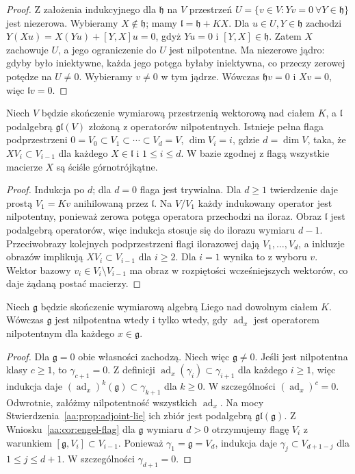 \begin{proof}
Z założenia indukcyjnego dla $\mathfrak h$ na $V$
przestrzeń $U=\{v\in V:Yv=0\ \forall Y\in\mathfrak h\}$
jest niezerowa. Wybieramy $X\notin\mathfrak h$;
mamy $\mathfrak l=\mathfrak h+KX$.
Dla $u\in U,Y\in\mathfrak h$ zachodzi
$Y(Xu)=X(Yu)+[Y,X]u=0$,
gdyż $Yu=0$ i $[Y,X]\in\mathfrak h$.
Zatem $X$ zachowuje $U$, a jego ograniczenie
do $U$ jest nilpotentne. Ma niezerowe jądro:
gdyby było iniektywne, każda jego potęga byłaby
iniektywna, co przeczy zerowej potędze na $U\ne0$.
Wybieramy $v\ne0$ w tym jądrze. Wówczas
$\mathfrak h v=0$ i $Xv=0$, więc $\mathfrak l v=0$.
\end{proof}

\begin{wniosek}
\label{aa:cor:engel-flag}
Niech $V$ będzie skończenie wymiarową przestrzenią
wektorową nad ciałem $K$, a $\mathfrak l$ podalgebrą
$\mathfrak{gl}(V)$ złożoną z operatorów nilpotentnych.
Istnieje pełna flaga podprzestrzeni
$0=V_0\subset V_1\subset\cdots\subset V_d=V$,
$\dim V_i=i$, gdzie $d=\dim V$, taka, że
$X V_i\subset V_{i-1}$ dla każdego $X\in\mathfrak l$
i $1\le i\le d$. W bazie zgodnej z flagą wszystkie
macierze $X$ są ściśle górnotrójkątne.
\end{wniosek}
\begin{proof}
Indukcja po $d$; dla $d=0$ flaga jest trywialna.
Dla $d\ge1$ twierdzenie daje prostą $V_1=Kv$
anihilowaną przez $\mathfrak l$.
Na $V/V_1$ każdy indukowany operator jest nilpotentny,
ponieważ zerowa potęga operatora przechodzi na iloraz.
Obraz $\mathfrak l$ jest podalgebrą operatorów,
więc indukcja stosuje się do ilorazu wymiaru $d-1$.
Przeciwobrazy kolejnych podprzestrzeni flagi ilorazowej
dają $V_1,\ldots,V_d$, a inkluzje obrazów implikują
$XV_i\subset V_{i-1}$ dla $i\ge2$.
Dla $i=1$ wynika to z wyboru $v$.
Wektor bazowy $v_i\in V_i\setminus V_{i-1}$
ma obraz w rozpiętości wcześniejszych wektorów,
co daje żądaną postać macierzy.
\end{proof}

\begin{twierdzenie}
\label{aa:tw:engel}
Niech $\mathfrak g$ będzie skończenie wymiarową
algebrą Liego nad dowolnym ciałem $K$.
Wówczas $\mathfrak g$ jest nilpotentna wtedy
i tylko wtedy, gdy $\operatorname{ad}_x$ jest
operatorem nilpotentnym dla każdego $x\in\mathfrak g$.
\end{twierdzenie}
\begin{proof}
Dla $\mathfrak g=0$ obie własności zachodzą.
Niech więc $\mathfrak g\ne0$. Jeśli jest nilpotentna
klasy $c\ge1$, to $\gamma_{c+1}=0$.
Z definicji $\operatorname{ad}_x(\gamma_i)
\subset\gamma_{i+1}$ dla każdego $i\ge1$, więc
indukcja daje $(\operatorname{ad}_x)^k(\mathfrak g)
\subset\gamma_{k+1}$ dla $k\ge0$.
W szczególności $(\operatorname{ad}_x)^c=0$.
Odwrotnie, załóżmy nilpotentność wszystkich
$\operatorname{ad}_x$. Na mocy
Stwierdzenia~\ref{aa:prop:adjoint-lie} ich zbiór jest
podalgebrą $\mathfrak{gl}(\mathfrak g)$.
Z Wniosku~\ref{aa:cor:engel-flag} dla $\mathfrak g$
wymiaru $d>0$ otrzymujemy flagę $V_i$ z warunkiem
$[\mathfrak g,V_i]\subset V_{i-1}$.
Ponieważ $\gamma_1=\mathfrak g=V_d$, indukcja daje
$\gamma_j\subset V_{d+1-j}$ dla $1\le j\le d+1$.
W szczególności $\gamma_{d+1}=0$.
\end{proof}

